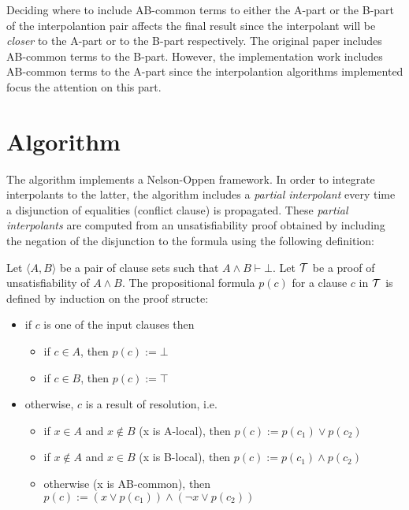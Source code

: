 Deciding where to include AB-common terms to either the 
A-part or the B-part of the interpolantion pair affects 
the final result since the interpolant will be \emph{closer} 
to the A-part or to the B-part respectively. The original
paper includes AB-common terms to the B-part. However,
the implementation work includes AB-common terms to the
A-part since the interpolantion algorithms implemented
focus the attention on this part.

\section{Algorithm}

The algorithm implements a Nelson-Oppen framework. In order to 
integrate interpolants to the latter, the algorithm includes a 
\emph{partial interpolant} every time a disjunction of equalities 
(conflict clause) is propagated. These \emph{partial interpolants} are 
computed from an unsatisfiability proof obtained by including the 
negation of the disjunction to the formula using the following
definition: 

\begin{definition} \cite{10.1007/11532231_26}
  Let $\langle A, B \rangle$ be a pair of clause sets such
  that $A \land B \vdash \bot$. Let $\cal{T}$ be a proof of
  unsatisfiability of $A \land B$. The propositional 
  formula $p(c)$ for a clause $c$ in $\cal{T}$ is defined
  by induction on the proof structe:
  \begin{itemize}
    \item if $c$ is one of the input clauses then
      \begin{itemize}
        \item if $c \in A$, then $p(c) := \bot$
        \item if $c \in B$, then $p(c) := \top$
      \end{itemize}
    \item otherwise, $c$ is a result of resolution, i.e. 
      \begin{prooftree}
      \end{prooftree}
      \begin{itemize}
        \item if $x \in A$ and $x \not \in B$ (x is A-local), then $p(c) := p(c_1) \lor p(c_2)$
        \item if $x \not \in A$ and $x \in B$ (x is B-local), then $p(c) := p(c_1) \land p(c_2)$
        \item otherwise (x is AB-common), then $p(c) := (x \lor p(c_1)) \land (\neg x \lor p(c_2))$
      \end{itemize}
  \end{itemize}
\end{definition}


